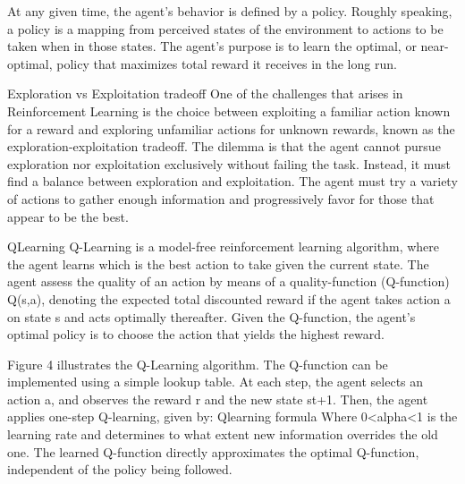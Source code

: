 At any given time, the agent’s behavior is defined by a policy. Roughly speaking, a policy is a mapping from perceived states of the environment to actions to be taken when in those states. The agent’s purpose is to learn the optimal, or near-optimal, policy that maximizes total reward it receives in the long run. 

Exploration vs Exploitation tradeoff
One of the challenges that arises in Reinforcement Learning is the choice between exploiting a familiar action known for a reward and exploring unfamiliar actions for unknown rewards, known as the exploration-exploitation tradeoff. The dilemma is that the agent cannot pursue exploration nor exploitation exclusively without failing the task. Instead, it must find a balance between exploration and exploitation. The agent must try a variety of actions to gather enough information and progressively favor for those that appear to be the best.

QLearning
Q-Learning is a model-free reinforcement learning algorithm, where the agent learns which is the best action to take given the current state. The agent assess the quality of an action by means of a quality-function (Q-function) Q(s,a), denoting the expected total discounted reward if the agent takes action a on state s and acts optimally thereafter. Given the Q-function, the agent’s optimal policy is to choose the action that yields the highest reward.

Figure 4 illustrates the Q-Learning algorithm. The Q-function can be implemented using a simple lookup table. At each step, the agent selects an action a, and observes the reward r and the new state st+1. Then, the agent applies one-step Q-learning, given by:
Qlearning formula
Where 0<alpha<1 is the learning rate and determines to what extent new information overrides the old one. The learned Q-function directly approximates the optimal Q-function, independent of the policy being followed.

